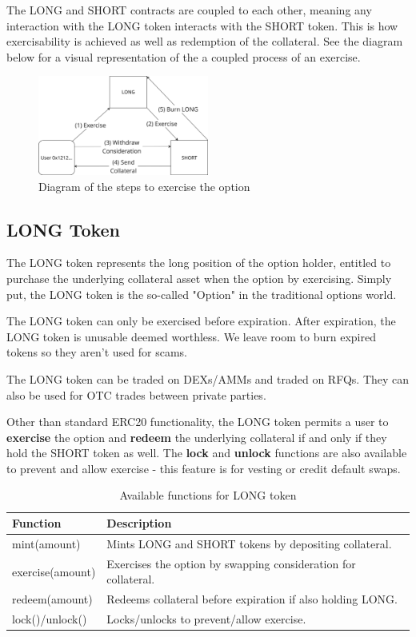 The LONG and SHORT contracts are coupled to each other, meaning any interaction with the LONG token interacts with the SHORT token.
This is how exercisability is achieved as well as redemption of the collateral. 
See the diagram below for a visual representation of the a coupled process of an exercise.
\begin{figure}[h]
  \centering
  \includegraphics[width=0.5\textwidth]{exercise.png}
  \caption{Diagram of the steps to exercise the option}
  \label{fig:exercise}
\end{figure}

\subsection{LONG Token}

The LONG token represents the long position of the option holder,
entitled to purchase the underlying collateral asset when the option by exercising. 
Simply put, the LONG token is the so-called "Option" in the traditional options world.

The LONG token can only be exercised before expiration. After expiration, the LONG token 
is unusable deemed worthless. We leave room to burn expired tokens so they aren't used for scams. 

The LONG token can be traded on DEXs/AMMs and traded on RFQs. 
They can also be used for OTC trades between private parties.

Other than standard ERC20 functionality, the LONG token permits a user to \textbf{exercise} the option and 
\textbf{redeem} the underlying collateral if and only if they hold the SHORT token as well. 
The \textbf{lock} and \textbf{unlock} functions are also available to prevent and allow exercise - this feature is for vesting or credit default swaps.

\begin{table}[h]
\centering
\begin{tabular}{|p{3cm}|p{4cm}|}
\hline
\textbf{Function} & \textbf{Description} \\
\hline
mint(amount)  & Mints LONG and SHORT tokens by depositing collateral. \\
\hline
exercise(amount) & Exercises the option by swapping consideration for collateral. \\
\hline
redeem(amount) & Redeems collateral before expiration if also holding LONG. \\
\hline
lock()/unlock() & Locks/unlocks to prevent/allow exercise. \\
\hline
\end{tabular}
\caption{Available functions for LONG token}
\label{tab:functions}
\end{table}


